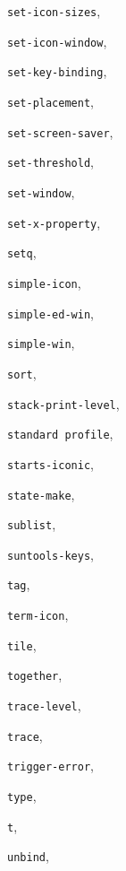 \begin{theindex}
\item {\tt set-icon-sizes}, {\bf\pageref{set-icon-sizes}}
\item {\tt set-icon-window}, {\bf\pageref{set-icon-window}}
\item {\tt set-key-binding}, {\bf\pageref{set-key-binding}}
\item {\tt set-placement}, {\bf\pageref{set-placement}}
\item {\tt set-screen-saver}, {\bf\pageref{set-screen-saver}}
\item {\tt set-threshold}, {\bf\pageref{set-threshold}}
\item {\tt set-window}, {\bf\pageref{set-window}}
\item {\tt set-x-property}, {\bf\pageref{set-x-property}}
\item {\tt setq}, {\bf\pageref{setq}}
\item {\tt simple-icon}, {\bf\pageref{simple-icon}}
\item {\tt simple-ed-win}, {\bf\pageref{simple-ed-win}}
\item {\tt simple-win}, {\bf\pageref{simple-win}}
\item {\tt sort}, {\bf\pageref{sort}}
\item {\tt stack-print-level}, {\bf\pageref{stack-print-level}}
\item {\tt standard profile}, {\bf\pageref{standard-profile}}
\item {\tt starts-iconic}, {\bf\pageref{starts-iconic}}
\item {\tt state-make}, {\bf\pageref{state-make}}
\item {\tt sublist}, {\bf\pageref{sublist}}
\item {\tt suntools-keys}, {\bf\pageref{suntools-keys}}
\item {\tt tag}, {\bf\pageref{tag}}
\item {\tt term-icon}, {\bf\pageref{term-icon}}
\item {\tt tile}, {\bf\pageref{tile}}
\item {\tt together}, {\bf\pageref{together}}
\item {\tt trace-level}, {\bf\pageref{trace-level}}
\item {\tt trace}, {\bf\pageref{trace}}
\item {\tt trigger-error}, {\bf\pageref{trigger-error}}
\item {\tt type}, {\bf\pageref{type}}
\item {\tt t}, {\bf\pageref{t}}
\item {\tt unbind}, {\bf\pageref{unbind}}

\end{theindex}

